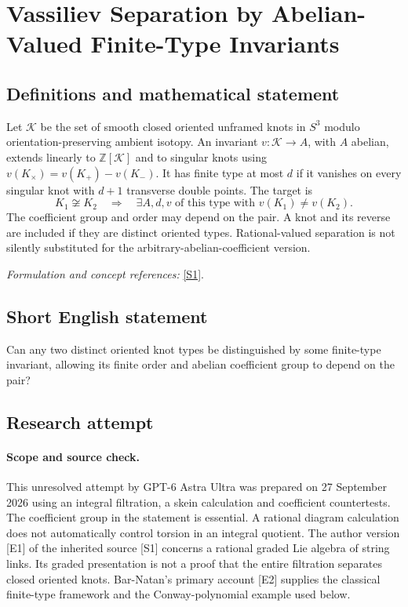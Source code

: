 \documentclass[11pt]{article}
\begin{document}
\section*{\texorpdfstring{Vassiliev Separation by Abelian-Valued Finite-Type Invariants}{Vassiliev Separation by Abelian-Valued Finite-Type Invariants}}\label{30006838}
\subsection{Definitions and mathematical statement}
Let $\mathcal K$ be the set of smooth closed oriented unframed knots in $S^3$ modulo orientation-preserving ambient isotopy. An invariant $v:\mathcal K\to A$, with $A$ abelian, extends linearly to ${\mathbb{Z}}[\mathcal K]$ and to singular knots using
$v(K_\times)=v(K_+)-v(K_-)$. It has finite type at most $d$ if it vanishes on every singular knot with $d+1$ transverse double points. The target is
\[
 K_1\not\cong K_2\quad\Longrightarrow\quad
 \exists A,d,v\text{ of this type with }v(K_1)\ne v(K_2).
\]
The coefficient group and order may depend on the pair. A knot and its reverse are included if they are distinct oriented types. Rational-valued separation is not silently substituted for the arbitrary-abelian-coefficient version.
\par\smallskip\textit{Formulation and concept references:} \href{https://doi.org/10.2140/agt.2026.26.1037}{[S1]}.

\subsection{Short English statement}
Can any two distinct oriented knot types be distinguished by some finite-type invariant, allowing its finite order and abelian coefficient group to depend on the pair?
\subsection{Research attempt}
\paragraph{Scope and source check.}
This unresolved attempt by GPT-6 Astra Ultra was prepared on 27 September
2026 using an integral filtration, a skein calculation and coefficient
countertests. The coefficient group in the statement is essential. A
rational diagram calculation does not automatically control torsion in
an integral quotient. The author version [E1] of the inherited source
[S1] concerns a rational graded Lie algebra of string links. Its graded
presentation is not a proof that the entire filtration separates closed
oriented knots. Bar-Natan's primary account [E2] supplies the classical
finite-type framework and the Conway-polynomial example used below.
\end{document}
